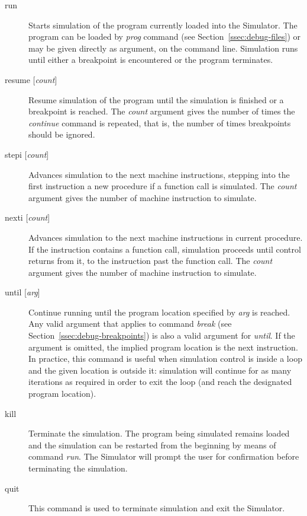 \documentclass[a4paper,twoside]{tceusermanual}
\begin{document}
\begin{description}
\item[run] %
  Starts simulation of the program currently loaded into the Simulator.  The
  program can be loaded by \emph{prog} command (see
  Section~\ref{ssec:debug-files}) or may be given directly as argument, on
  the command line.  Simulation runs until either a breakpoint is
  encountered or the program terminates.

\item[resume {[\emph{count}]}] %
  Resume simulation of the program until the simulation is finished or a
  breakpoint is reached.  The \emph{count} argument gives the
  number of times the \emph{continue} command is repeated, that is, the
  number of times breakpoints should be ignored.

\item[stepi {[\emph{count}]}] %
  Advances simulation to the next machine instructions, stepping into the
  first instruction a new procedure if a function call is simulated.  The
  \emph{count} argument gives the number of machine instruction to simulate.

\item[nexti {[\emph{count}]}] %
  Advances simulation to the next machine instructions in current procedure.
  If the instruction contains a function call, simulation proceeds until
  control returns from it, to the instruction past the function call.  The
  \emph{count} argument gives the number of machine instruction to simulate.

\item[until {[\emph{arg}]}] %
  Continue running until the program location specified by \emph{arg} is
  reached.  Any valid argument that applies to command \emph{break} (see
  Section~\ref{ssec:debug-breakpoints}) is also a valid argument for
  \emph{until}.  If the argument is omitted, the implied program location
  is the next instruction.  In practice, this command is useful when
  simulation control is inside a loop and the given location is outside it:
  simulation will continue for as many iterations as required in order to
  exit the loop (and reach the designated program location).

\item[kill] %
  Terminate the simulation.  The program being simulated remains loaded and
  the simulation can be restarted from the beginning by means of command
  \emph{run}.  The Simulator will prompt the user for confirmation
  before terminating the simulation.

\item[quit] %
  This command is used to terminate simulation and exit the Simulator.
\end{description}
\end{document}
